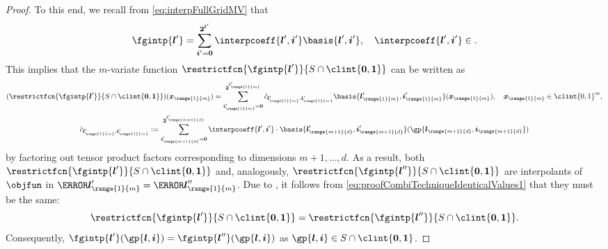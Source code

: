 \begin{proof}
  To this end, we recall from \eqref{eq:interpFullGridMV} that
  \begin{equation}
    \fgintp{\*l'}
    = \sum_{\*i'=\*0}^{\*2^{\*l'}} \interpcoeff{\*l',\*i'}
    \basis{\*l',\*i'},\quad
    \interpcoeff{\*l',\*i'} \in \real.
  \end{equation}
  This implies that the $m$-variate function
  $\restrictfcn{\fgintp{\*l'}}{S \cap \clint{\*0, \*1}}$ can be written as
  \begin{subequations}
    \begin{gather}
      (\restrictfcn{\fgintp{\*l'}}{S \cap \clint{\*0, \*1}})(\*x_{\range{1}{m}})
      = \sum_{\*i'_{\range{1}{m}}=\*0}^{\*2^{\*l'_{\range{1}{m}}}}
      \interpcoefftilde{\*l'_{\range{1}{m}},\*i'_{\range{1}{m}}}
      \basis{\*l'_{\range{1}{m}},\*i'_{\range{1}{m}}}(\*x_{\range{1}{m}}),\quad
      \*x_{\range{1}{m}} \in \clint{0, 1}^m,\\
      \interpcoefftilde{\*l'_{\range{1}{m}},\*i'_{\range{1}{m}}}
      := \sum_{\*i'_{\range{m+1}{d}}=\*0}^{\*2^{\*l'_{\range{m+1}{d}}}}
      \interpcoeff{\*l',\*i'} \cdot
      \basis{\*l'_{\range{m+1}{d}},\*i'_{\range{m+1}{d}}}%
      (\gp{\*l_{\range{m+1}{d}},\*i_{\range{m+1}{d}}})
    \end{gather}
  \end{subequations}
  by factoring out tensor product factors corresponding to dimensions
  $m + 1, \dotsc, d$.
  As a result,
  both $\restrictfcn{\fgintp{\*l'}}{S \cap \clint{\*0, \*1}}$
  and, analogously,
  $\restrictfcn{\fgintp{\*l''}}{S \cap \clint{\*0, \*1}}$
  are interpolants of $\objfun$ in
  $\ns{\*l'_{\range{1}{m}}} = \ns{\*l''_{\range{1}{m}}}$.
  Due to ,
  it follows from \eqref{eq:proofCombiTechniqueIdenticalValues1}
  that they must be the same:
  \begin{equation}
    \restrictfcn{\fgintp{\*l'}}{S \cap \clint{\*0, \*1}}
    = \restrictfcn{\fgintp{\*l''}}{S \cap \clint{\*0, \*1}}.
  \end{equation}
  Consequently, $\fgintp{\*l'}(\gp{\*l,\*i}) = \fgintp{\*l''}(\gp{\*l,\*i})$
  as $\gp{\*l,\*i} \in S \cap \clint{\*0, \*1}$.
\end{proof}

\lemmaCombiTechniqueCharacterization*

